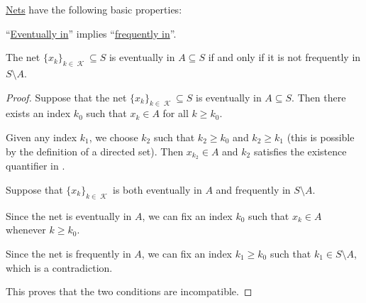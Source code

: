 \begin{proposition}\label{thm:def:topological_net/properties}
  \hyperref[def:topological_net]{Nets} have the following basic properties:

  \begin{thmenum}
     \enquote{\hyperref[def:topological_net/eventually_in]{Eventually in}} implies \enquote{\hyperref[def:topological_net/frequently_in]{frequently in}}.

     The net \( \{ x_k \}_{k \in \mscrK} \subseteq S \) is eventually in \( A \subseteq S \) if and only if it is not frequently in \( S \setminus A \).
  \end{thmenum}
\end{proposition}
\begin{proof}
   Suppose that the net \( \{ x_k \}_{k \in \mscrK} \subseteq S \) is eventually in \( A \subseteq S \). Then there exists an index \( k_0 \) such that \( x_k \in A \) for all \( k \geq k_0 \).

  Given any index \( k_1 \), we choose \( k_2 \) such that \( k_2 \geq k_0 \) and \( k_2 \geq k_1 \) (this is possible by the definition of a directed set). Then \( x_{k_2} \in A \) and \( k_2 \) satisfies the existence quantifier in .

   Suppose that \( \{ x_k \}_{k \in \mscrK} \) is both eventually in \( A \) and frequently in \( S \setminus A \).

  Since the net is eventually in \( A \), we can fix an index \( k_0 \) such that \( x_k \in A \) whenever \( k \geq k_0 \).

  Since the net is frequently in \( A \), we can fix an index \( k_1 \geq k_0 \) such that \( k_1 \in S \setminus A \), which is a contradiction.

  This proves that the two conditions are incompatible.
\end{proof}

